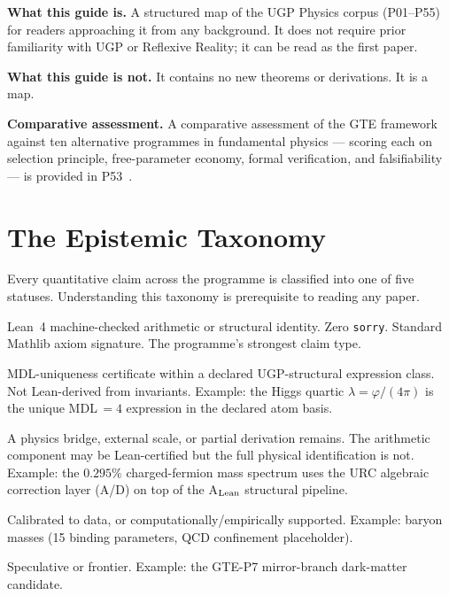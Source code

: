 \documentclass[11pt]{article}
\begin{document}
\medskip
\noindent\textbf{What this guide is.}  A structured map of the UGP Physics corpus
(P01--P55) for readers approaching it from any background.  It does not require
prior familiarity with UGP or Reflexive Reality; it can be read as the first paper.

\medskip
\noindent\textbf{What this guide is not.}  It contains no new theorems or derivations.
It is a map.

\medskip
\noindent\textbf{Comparative assessment.}  A comparative assessment of the GTE framework against ten alternative programmes in fundamental physics --- scoring each on selection principle, free-parameter economy, formal verification, and falsifiability --- is provided in P53~\cite{SpivackGTEFrameworkAssessment}.

\section{The Epistemic Taxonomy}
\label{sec:taxonomy}

Every quantitative claim across the programme is classified into one of five
statuses.  Understanding this taxonomy is prerequisite to reading any paper.

\begin{tcolorbox}[colback=gray!4,colframe=gray!50!black,
  title={\textbf{Five-status claim taxonomy (used throughout the programme)}},
  fonttitle=\bfseries,left=6pt,right=6pt,top=5pt,bottom=5pt]
\small
\begin{description}[leftmargin=1.6em,itemsep=0.3em]
  \item[\textbf{A}$_{\rm Lean}$ (plain \textbf{A}):] Lean~4 machine-checked arithmetic
    or structural identity.  Zero \texttt{sorry}.  Standard Mathlib axiom signature.
    The programme's strongest claim type.
  \item[\textbf{A}$_{\rm MDL}$:] MDL-uniqueness certificate within a declared
    UGP-structural expression class.  Not Lean-derived from invariants.  Example:
    the Higgs quartic $\lambda = \varphi/(4\pi)$ is the unique MDL\,$=4$ expression
    in the declared atom basis.
  \item[\textbf{A/D}:] A physics bridge, external scale, or partial derivation
    remains.  The arithmetic component may be Lean-certified but the full physical
    identification is not.  Example: the $0.295\%$ charged-fermion mass spectrum
    uses the URC algebraic correction layer (A/D) on top of the A$_{\rm Lean}$
    structural pipeline.
  \item[\textbf{B}:] Calibrated to data, or computationally/empirically supported.
    Example: baryon masses (15 binding parameters, QCD confinement placeholder).
  \item[\textbf{D}:] Speculative or frontier.  Example: the GTE-P7 mirror-branch
    dark-matter candidate.
\end{description}
\end{tcolorbox}
\end{document}
